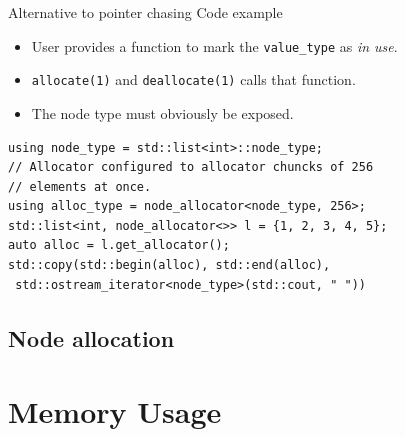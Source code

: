 \documentclass[10pt,aspectratio=169]{beamer}
\def\mbq{\node[style=mbq]}
\begin{document}
\begin{frame}[fragile]{Alternative to pointer chasing}
Code example
\begin{itemize}
\item User provides a function to mark the \texttt{value\_type}
as {\it in use}.
\item \texttt{allocate(1)} and \texttt{deallocate(1)} calls that 
function.
\item The node type must obviously be exposed.
\end{itemize}

\begin{lstlisting}
using node_type = std::list<int>::node_type;
// Allocator configured to allocator chuncks of 256
// elements at once.
using alloc_type = node_allocator<node_type, 256>;
std::list<int, node_allocator<>> l = {1, 2, 3, 4, 5};
auto alloc = l.get_allocator();
std::copy(std::begin(alloc), std::end(alloc),
 std::ostream_iterator<node_type>(std::cout, " "))
\end{lstlisting}

\end{frame}


\subsection[Node allocation]{Node allocation}
%
%
%

\section[Memory Usage]{Memory Usage}
\end{document}
